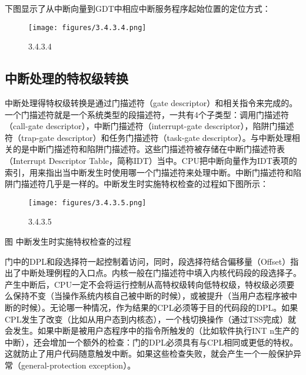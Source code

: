 下图显示了从中断向量到GDT中相应中断服务程序起始位置的定位方式：

\begin{figure}[htbp]
\centering
\texttt{[image: figures/3.4.3.4.png]}
\caption{3.4.3.4}
\end{figure}

\subsection{中断处理的特权级转换}\label{ux4e2dux65adux5904ux7406ux7684ux7279ux6743ux7ea7ux8f6cux6362}

中断处理得特权级转换是通过门描述符（gate
descriptor）和相关指令来完成的。一个门描述符就是一个系统类型的段描述符，一共有4个子类型：调用门描述符（call-gate
descriptor），中断门描述符（interrupt-gate
descriptor），陷阱门描述符（trap-gate
descriptor）和任务门描述符（task-gate
descriptor）。与中断处理相关的是中断门描述符和陷阱门描述符。这些门描述符被存储在中断门描述符表（Interrupt
Descriptor
Table，简称IDT）当中。CPU把中断向量作为IDT表项的索引，用来指出当中断发生时使用哪一个门描述符来处理中断。中断门描述符和陷阱门描述符几乎是一样的。中断发生时实施特权检查的过程如下图所示：

\begin{figure}[htbp]
\centering
\texttt{[image: figures/3.4.3.5.png]}
\caption{3.4.3.5}
\end{figure}

图 中断发生时实施特权检查的过程

门中的DPL和段选择符一起控制着访问，同时，段选择符结合偏移量（Offset）指出了中断处理例程的入口点。内核一般在门描述符中填入内核代码段的段选择子。产生中断后，CPU一定不会将运行控制从高特权级转向低特权级，特权级必须要么保持不变（当操作系统内核自己被中断的时候），或被提升（当用户态程序被中断的时候）。无论哪一种情况，作为结果的CPL必须等于目的代码段的DPL。如果CPL发生了改变（比如从用户态到内核态），一个栈切换操作（通过TSS完成）就会发生。如果中断是被用户态程序中的指令所触发的（比如软件执行INT
n生产的中断），还会增加一个额外的检查：门的DPL必须具有与CPL相同或更低的特权。这就防止了用户代码随意触发中断。如果这些检查失败，就会产生一个一般保护异常（general-protection
exception）。

